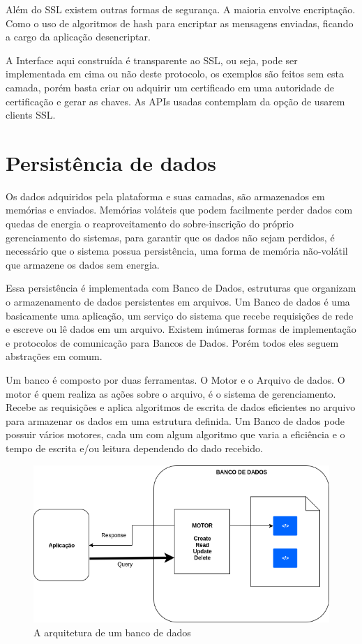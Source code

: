 Além do SSL existem outras formas de segurança. A maioria envolve encriptação. Como o uso de algoritmos de hash para encriptar as mensagens enviadas, ficando a cargo da aplicação desencriptar.

A Interface aqui construída é transparente ao SSL, ou seja, pode ser implementada em cima ou não deste protocolo, os exemplos são feitos sem esta camada, porém basta criar ou adquirir um certificado em uma autoridade de certificação e gerar as chaves. As APIs usadas contemplam da opção de usarem clients SSL.


\section{Persistência de dados}
\label{section:persistencia}

Os dados adquiridos pela plataforma e suas camadas, são armazenados em memórias e enviados. Memórias voláteis que podem facilmente perder dados com quedas de energia o reaproveitamento do sobre-inscrição do próprio gerenciamento do sistemas, para garantir que os dados não sejam perdidos, é necessário que o sistema possua persistência, uma forma de memória não-volátil que armazene os dados sem energia.

Essa persistência é implementada com Banco de Dados, estruturas que organizam o armazenamento de dados persistentes em arquivos. Um Banco de dados é uma basicamente uma aplicação, um serviço do sistema que recebe requisições de rede e escreve ou lê dados em um arquivo. Existem inúmeras formas de implementação e protocolos de comunicação para Bancos de Dados. Porém todos eles seguem abstrações em comum.

Um banco é composto por duas ferramentas. O Motor e o Arquivo de dados. O motor é quem realiza as ações sobre o arquivo, é o sistema de gerenciamento. Recebe as requisições e aplica algoritmos de escrita de dados eficientes no arquivo para armazenar os dados em uma estrutura definida. Um Banco de dados pode possuir vários motores, cada um com algum algoritmo que varia a eficiência e o tempo de escrita e/ou leitura dependendo do dado recebido.

\begin{figure}[h!]
\centering
\includegraphics[width=12cm]{./02_Capitulos/02_Cap3/figures/Database_Arch}
\caption{A arquitetura de um banco de dados}
\label{fig:3.3.5/database_arch}
\end{figure}

